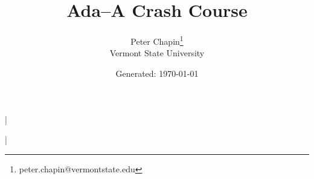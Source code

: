 \documentclass{scrreprt}
\begin{document}
\titlehead{\centering\texttt{[image: Ada-Mascot.pdf]}}
\title{Ada--A Crash Course}
\author{Peter Chapin\thanks{peter.chapin@vermontstate.edu}\\
  Vermont State University}
\date{Generated: \today}
\maketitle

\tableofcontents

\lstMakeShortInline|





\lstDeleteShortInline|

%
%
%
%
%



\end{document}
